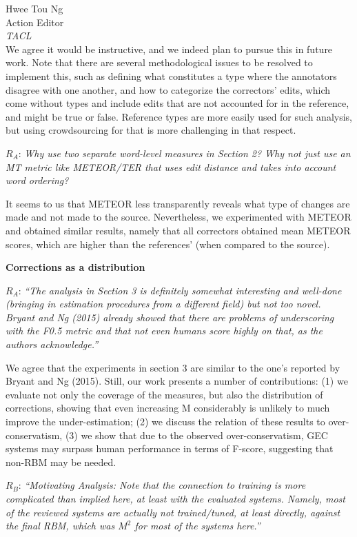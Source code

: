 \documentclass[11pt,letterpaper]{letter}
\begin{document}
\begin{letter}{%
Hwee Tou Ng\\
Action Editor\\
{\em TACL}\\
}
We agree it would be instructive, and we indeed plan to pursue this in future work. Note that there are several methodological issues to be resolved to implement this, such as defining what constitutes a type where the annotators disagree with one another, and how to categorize the correctors' edits, which come without types and  include edits that are not accounted for in the reference, and might be true or false. Reference types are more easily used for such analysis, but using crowdsourcing for that is more challenging in that respect.
	
$R_A$: \emph{Why use two separate word-level measures in Section 2? Why not just use
	an MT metric like METEOR/TER that uses edit distance and takes into account
	word ordering?}

It seems to us that METEOR less transparently reveals what type of changes are made and not made to the source. Nevertheless, we experimented with METEOR and obtained similar results, namely that all correctors obtained mean METEOR scores, which are higher than the references' (when compared to the source).

{\bf Corrections as a distribution}

$R_A$: \emph{``The analysis in Section 3 is definitely somewhat interesting and
	well-done (bringing in estimation procedures from a different field) but not
	too novel. Bryant and Ng (2015) already showed that there are problems of
	underscoring with the F0.5 metric and that not even humans score highly on
	that, as the authors acknowledge.''
	}
	
We agree that the experiments in section 3 are similar to the one's reported by Bryant and Ng (2015). Still, our work presents a number of contributions: (1) we evaluate not only the coverage of the measures, but also the distribution of corrections, showing that even increasing M considerably is unlikely to much improve the under-estimation; (2) we discuss the relation of these results to over-conservatism, (3) we show that due to the observed over-conservatism, GEC systems may surpass human performance in terms of F-score, suggesting that non-RBM may be needed.

$R_B$: \emph{``Motivating Analysis: Note that the connection to training is more
	complicated than implied here, at least with the evaluated systems. Namely,
	most of the reviewed systems are actually not trained/tuned, at least
	directly, against the final RBM, which was $M^2$ for most of the systems here.''
	}
	

\end{letter}
\end{document}
